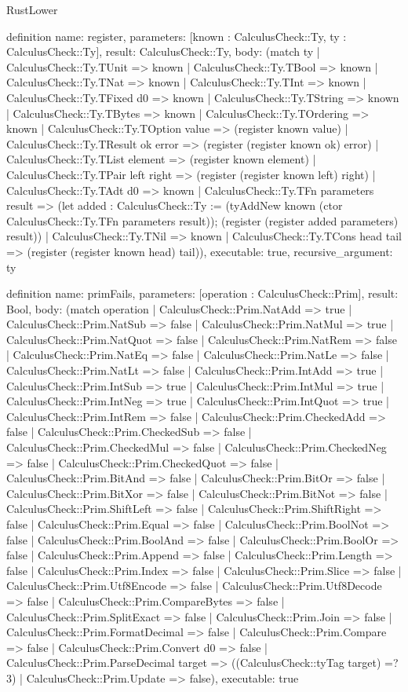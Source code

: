 \begin{lexlean}{RustLower}
\begin{semanticmodule}
definition{
  name: register,
  parameters: [known : CalculusCheck::Ty, ty : CalculusCheck::Ty],
  result: CalculusCheck::Ty,
  body: (match ty
    | CalculusCheck::Ty.TUnit => known
    | CalculusCheck::Ty.TBool => known
    | CalculusCheck::Ty.TNat => known
    | CalculusCheck::Ty.TInt => known
    | CalculusCheck::Ty.TFixed d0 => known
    | CalculusCheck::Ty.TString => known
    | CalculusCheck::Ty.TBytes => known
    | CalculusCheck::Ty.TOrdering => known
    | CalculusCheck::Ty.TOption value => (register known value)
    | CalculusCheck::Ty.TResult ok error => (register (register known ok) error)
    | CalculusCheck::Ty.TList element => (register known element)
    | CalculusCheck::Ty.TPair left right => (register (register known left) right)
    | CalculusCheck::Ty.TAdt d0 => known
    | CalculusCheck::Ty.TFn parameters result => (let added : CalculusCheck::Ty := (tyAddNew known (ctor CalculusCheck::Ty.TFn parameters result)); (register (register added parameters) result))
    | CalculusCheck::Ty.TNil => known
    | CalculusCheck::Ty.TCons head tail => (register (register known head) tail)),
  executable: true,
  recursive_argument: ty
}

definition{
  name: primFails,
  parameters: [operation : CalculusCheck::Prim],
  result: Bool,
  body: (match operation
    | CalculusCheck::Prim.NatAdd => true
    | CalculusCheck::Prim.NatSub => false
    | CalculusCheck::Prim.NatMul => true
    | CalculusCheck::Prim.NatQuot => false
    | CalculusCheck::Prim.NatRem => false
    | CalculusCheck::Prim.NatEq => false
    | CalculusCheck::Prim.NatLe => false
    | CalculusCheck::Prim.NatLt => false
    | CalculusCheck::Prim.IntAdd => true
    | CalculusCheck::Prim.IntSub => true
    | CalculusCheck::Prim.IntMul => true
    | CalculusCheck::Prim.IntNeg => true
    | CalculusCheck::Prim.IntQuot => true
    | CalculusCheck::Prim.IntRem => false
    | CalculusCheck::Prim.CheckedAdd => false
    | CalculusCheck::Prim.CheckedSub => false
    | CalculusCheck::Prim.CheckedMul => false
    | CalculusCheck::Prim.CheckedNeg => false
    | CalculusCheck::Prim.CheckedQuot => false
    | CalculusCheck::Prim.BitAnd => false
    | CalculusCheck::Prim.BitOr => false
    | CalculusCheck::Prim.BitXor => false
    | CalculusCheck::Prim.BitNot => false
    | CalculusCheck::Prim.ShiftLeft => false
    | CalculusCheck::Prim.ShiftRight => false
    | CalculusCheck::Prim.Equal => false
    | CalculusCheck::Prim.BoolNot => false
    | CalculusCheck::Prim.BoolAnd => false
    | CalculusCheck::Prim.BoolOr => false
    | CalculusCheck::Prim.Append => false
    | CalculusCheck::Prim.Length => false
    | CalculusCheck::Prim.Index => false
    | CalculusCheck::Prim.Slice => false
    | CalculusCheck::Prim.Utf8Encode => false
    | CalculusCheck::Prim.Utf8Decode => false
    | CalculusCheck::Prim.CompareBytes => false
    | CalculusCheck::Prim.SplitExact => false
    | CalculusCheck::Prim.Join => false
    | CalculusCheck::Prim.FormatDecimal => false
    | CalculusCheck::Prim.Compare => false
    | CalculusCheck::Prim.Convert d0 => false
    | CalculusCheck::Prim.ParseDecimal target => ((CalculusCheck::tyTag target) =? 3)
    | CalculusCheck::Prim.Update => false),
  executable: true
}


\end{semanticmodule}
\end{lexlean}
